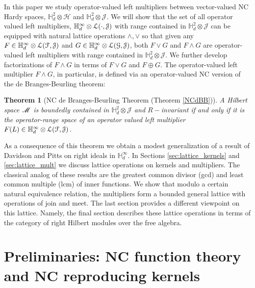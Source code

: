 \documentclass[11pt]{article}
\newcommand{\scr}{\ensuremath{\mathscr}}
\newcommand{\mc}{\ensuremath{\mathcal}}
\def\cH{\mathcal{H}}
\def\bH{\mathbb{H}}
\def\cJ{\mathcal{J}}
\numberwithin{equation}{section}
\numberwithin{subsection}{section}
\newtheorem*{thm*}{Theorem}
\theoremstyle{definition}
\begin{document}
In this paper we study operator-valued left multipliers between vector-valued NC Hardy spaces, $\bH ^2 _d \otimes \cH$ and $\bH ^2 _d \otimes \cJ$. We will show that the set of all operator valued left multipliers, $\bH ^\infty _d \otimes \mc{L} (\cdot , \cJ)$ with range contained in $\bH ^2 _d \otimes \cJ$ can be equipped with natural lattice operations $\wedge, \vee$ so that given any $F \in \bH ^\infty _d \otimes \mc{L} (\mc{F} , \mc{J} ) $ and $G \in \bH ^\infty _d \otimes \mc{L} (\mc{G} , \mc{J} )$, both $F \vee G$ and $F \wedge G$ are operator-valued left multipliers with range contained in $\bH ^2 _d \otimes \cJ$. We further develop factorizations of $F \wedge G$ in terms of $F \vee G$ and $F \oplus G$. The operator-valued left multiplier $F \wedge G$, in particular, is defined via an operator-valued NC version of the de Branges-Beurling theorem:

\begin{thm*}[NC de Branges-Beurling Theorem (Theorem \ref{NCdBB})]
A Hilbert space $\scr{M}$ is boundedly contained in $\bH ^2 _d \otimes \cJ$ and $R-$invariant if and only if it is the operator-range space of an operator valued left multiplier $F (L) \in \bH ^\infty _d \otimes \mc{L} (\mc{F} , \mc{J} )$.
\end{thm*}

As a consequence of this theorem we obtain a modest generalization of a result of Davidson and Pitts on right ideals in $\bH^{\infty}_d$. In Sections \ref{sec:lattice_kernels} and \ref{sec:lattice_mult} we discuss lattice operations on kernels and multipliers. The classical analog of these results are the greatest common divisor (gcd) and least common multiple (lcm) of inner functions. We show that modulo a certain natural equivalence relation, the multipliers form a bounded general lattice with operations of join and meet. The last section provides a different viewpoint on this lattice. Namely, the final section describes these lattice operations in terms of the category of right Hilbert modules over the free algebra.

\section{Preliminaries: NC function theory and NC reproducing kernels}
\end{document}
